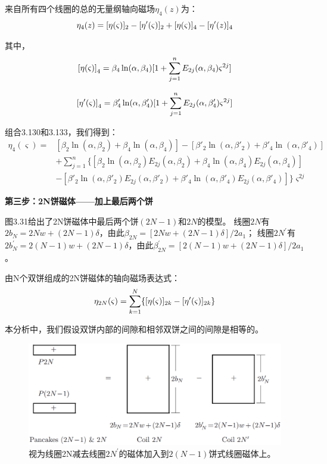 来自所有四个线圈的总的无量纲轴向磁场$\eta_4(z)$为：
\begin{equation}
\eta_{4}(z)=[\eta(\varsigma)]_{2}-[\eta'(\varsigma)]_{2}+[\eta(\varsigma)]_{4}-[\eta'(z)]_{4}\\%
\end{equation}

其中，
\begin{equation}
{[\eta(\varsigma)]}_{4}=\beta_{4}\ln(\alpha,\beta_{4})[1+\sum_{j=1}^{n}E_{2j}(\alpha,\beta_{4})\varsigma^{2j}]\\%
\end{equation}

\begin{equation}
{[\eta'(\varsigma)]}_{4}=\beta'_{4}\ln(\alpha,\beta'_{4})[1+\sum_{j=1}^{n}E_{2j}(\alpha,\beta'_{4})\varsigma^{2j}]\\%
\end{equation}

组合3.130和3.133，我们得到：
\begin{equation}
\begin{split}
\eta_{4}(\varsigma)=&[\beta_{2}\ln(\alpha,\beta_{2})+\beta_{4}\ln(\alpha,\beta_{4})]-[\beta'_{2}\ln(\alpha,\beta'_{2})+\beta'_{4}\ln(\alpha,\beta'_{4})]\\
&+\sum_{j=1}^{n}\{[\beta_{2}\ln(\alpha,\beta_{2})E_{2j}(\alpha,\beta_{2})+\beta_{4}\ln(\alpha,\beta_{4})E_{2j}(\alpha,\beta_{4})]\\
&-[\beta'_{2}\ln(\alpha,\beta'_{2})E_{2j}(\alpha,\beta'_{2})+\beta'_{4}\ln(\alpha,\beta'_{4})E_{2j}(\alpha,\beta'_{4})]\}\varsigma^{2j}%
\end{split}
\end{equation}

\textbf{第三步：2N饼磁体——加上最后两个饼}

图3.31给出了2N饼磁体中最后两个饼$(2N−1)$和$2N$的模型。
线圈$2N$有$2b_N =2Nw+(2N−1)\delta$，由此$\beta_{2N}=[2Nw+(2N−1)\delta]/2a_1$；
线圈$2N^\prime$有$2b_N^\prime=2(N-1)w+(2N−1)\delta$，由此$\beta_{2N}^\prime=[2(N-1)w+(2N−1)\delta]/2a_1$。

由N个双饼组成的2N饼磁体的轴向磁场表达式：
\begin{equation}
\eta_{2N}(\varsigma)=\sum_{k=1}^{N}\{[\eta(\varsigma)]_{2k}-[\eta'(\varsigma)]_{2k}\}\\%
\end{equation}

本分析中，我们假设双饼内部的间隙和相邻双饼之间的间隙是相等的。
\begin{figure}[htbp]
	\centering
	\includegraphics[scale=0.4]{chpt3/figs/fig3.31.eps}
	\caption{视为线圈2N减去线圈$2N^\prime$的磁体加入到$2(N-1)$饼式线圈磁体上。}
\end{figure}

